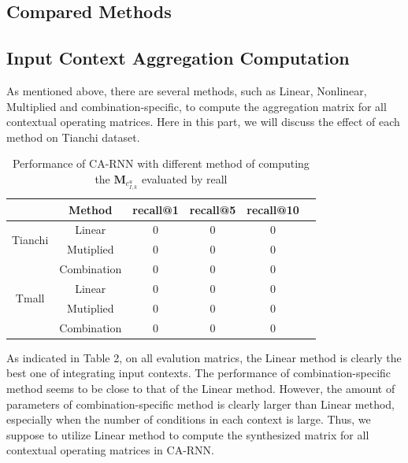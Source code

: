 \documentclass{sig-alternate}
\begin{document}
\subsection{Compared Methods}

\subsection{Input Context Aggregation Computation}
As mentioned above, there are several methods, such as Linear, Nonlinear, Multiplied and combination-specific, to compute the aggregation matrix for all contextual operating matrices. Here in this part, we will discuss the effect of each method on Tianchi dataset.



\begin{table}[!htbp]
  \centering
  \caption{Performance of CA-RNN with different method of computing the $\textbf{M}_{c_{I,k}^{u}}$ evaluated by reall}
    \begin{tabular}{cccccc}
    \toprule
          & Method& recall@1 & recall@5 & recall@10\\
    \midrule
    \multirow{2}[0]{*}{Tianchi} 
         &Linear& 0& 0& 0\\
        &Mutiplied& 0& 0& 0\\
        &Combination& 0& 0& 0\\
    \midrule
    \multirow{2}[0]{*}{Tmall} 
         &Linear& 0& 0& 0\\
        &Mutiplied& 0& 0& 0\\
        &Combination& 0& 0& 0\\
    \bottomrule
    \end{tabular}%
\end{table}%

As indicated in Table 2, on all evalution matrics, the Linear method is clearly the best one of integrating input contexts. The performance of combination-specific method seems to be close to that of the Linear method. However, the amount of parameters of combination-specific method is clearly larger than Linear method, especially when the number of conditions in each context is large.
Thus, we suppose to utilize Linear method to compute the synthesized matrix for all contextual operating matrices in CA-RNN.
\end{document}
